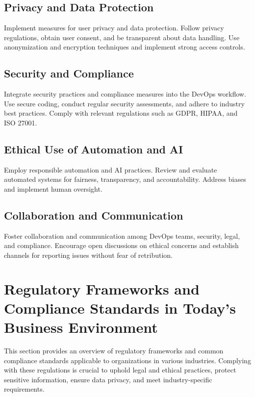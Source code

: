 \documentclass[conference]{IEEEtran}
\begin{document}
\subsection{Privacy and Data Protection}

Implement measures for user privacy and data protection. Follow privacy regulations, obtain user consent, and be transparent about data handling. Use anonymization and encryption techniques and implement strong access controls.

\subsection{Security and Compliance}

Integrate security practices and compliance measures into the DevOps workflow. Use secure coding, conduct regular security assessments, and adhere to industry best practices. Comply with relevant regulations such as GDPR, HIPAA, and ISO 27001.


\subsection{Ethical Use of Automation and AI}

Employ responsible automation and AI practices. Review and evaluate automated systems for fairness, transparency, and accountability. Address biases and implement human oversight.

\subsection{Collaboration and Communication}

Foster collaboration and communication among DevOps teams, security, legal, and compliance. Encourage open discussions on ethical concerns and establish channels for reporting issues without fear of retribution.

\section{Regulatory Frameworks and Compliance Standards in Today's Business Environment}

This section provides an overview of regulatory frameworks and common compliance standards applicable to organizations in various industries. Complying with these regulations is crucial to uphold legal and ethical practices, protect sensitive information, ensure data privacy, and meet industry-specific requirements.
\end{document}
